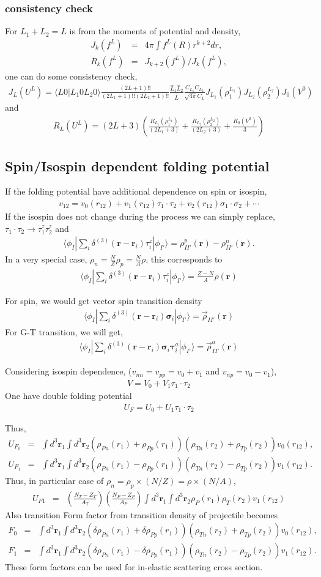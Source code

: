 \documentclass[11pt]{book}
\def\bm{\boldsymbol}
\def\vr{{\bm r}}
\def\la{\langle}
\def\ra{\rangle}
\newcommand{\bea}{\begin{eqnarray}}
\newcommand{\eea}{\end{eqnarray}}
\newcommand{\no}{\nonumber \\}
\begin{document}
\subsubsection{consistency check}
For $L_1+L_2=L$ is from the moments of potential and density,
\bea 
J_k(f^L)&=&4\pi\int f^L(R) r^{k+2} dr, \no 
R_k(f^L)&=& J_{k+2}(f^L)/J_k(f^L),
\eea 
one can do some consistency check,
\bea 
J_L(U^L)=\la L 0|L_1 0 L_2 0\ra \frac{(2L+1)!!}{(2L_1+1)!!(2L_2+1)!!}\frac{\hat{L}_1 \hat{L}_2}{\hat{L}}\frac{C_{L_1} C_{L_2}}{\sqrt{4\pi} C_L} 
 J_{L_1}(\rho^{L_1}_1)J_{L_2}(\rho^{L_2}_2)J_{0}(V^0)
\eea 
and 
\bea 
R_L(U^L)=(2L+3)\left(\frac{R_{L_1}(\rho_1^{L_1})}{(2L_1+3)}
      +\frac{R_{L_2}(\rho_2^{L_2})}{(2L_2+3)}
      +\frac{R_{0}(V^0)}{3} \right) 
\eea 

\subsection{Spin/Isospin dependent folding potential}
If the folding potential have additional dependence on spin or isospin,
\bea 
v_{12}=v_0(r_{12})+v_1(r_{12})\tau_1\cdot\tau_2+v_2(r_{12})\sigma_1\cdot\sigma_2+\cdots 
\eea  
If the isospin does not change during the process we can simply replace, 
$\tau_1\cdot\tau_2\to \tau_1^z \tau_2^z$ and 
\bea 
\la \phi_{I}|\sum_{i}  \delta^{(3)}(\vr-\vr_i)\tau_i^z |\phi_{I'}\ra
= \rho^p_{II'}(\vr)-\rho^n_{II'}(\vr).
\eea  
In a very special case, $\rho_n=\frac{N}{Z}\rho_p=\frac{N}{A}\rho$, this corresponds to 
\bea 
\la \phi_{I}|\sum_{i}  \delta^{(3)}(\vr-\vr_i)\tau_i^z |\phi_{I'}\ra =\frac{Z-N}{A}\rho(\vr)
\eea 


For spin, we would get vector spin transition density 
\bea 
\la \phi_{I}|\sum_{i}  \delta^{(3)}(\vr-\vr_i){\bm \sigma}_i|\phi_{I'}\ra
={\vec \rho}_{II'}(\vr)
\eea 
For G-T transition, we will get,
\bea 
\la \phi_{I}|\sum_{i}  \delta^{(3)}(\vr-\vr_i){\bm \sigma}_i{\bm \tau}^a_i|\phi_{I'}\ra
={\vec \rho}^a_{II'}(\vr)
\eea 

Considering isospin dependence, ($v_{nn}=v_{pp}=v_0+v_1$ and $v_{np}=v_0-v_1$),
\bea 
V= V_0 +V_1 \tau_1\cdot\tau_2 
\eea 
One have double folding potential
\bea 
U_F = U_0 + U_1 \tau_1\cdot\tau_2 
\eea 

Thus, 
\bea 
U_{F_0}&=&\int d^3\vr_1 \int d^3 \vr_2 (\rho_{P n}(r_1)+\rho_{P p}(r_1)  )
(\rho_{T n}(r_2)+\rho_{T p}(r_2)  ) v_0(r_{12}) ,\no 
U_{F_1}&=&\int d^3\vr_1 \int d^3 \vr_2 (\rho_{P n}(r_1)-\rho_{P p}(r_1)  ) 
(\rho_{T n}(r_2)-\rho_{T p}(r_2)  ) v_1(r_{12}). 
\eea 
Thus, in particular case of $\rho_n = \rho_p\times(N/Z) =\rho\times (N/A)$,
\bea 
U_{F1}&=& \left( \frac{N_T-Z_{T}}{A_T}\right) \left( \frac{N_P-Z_{P}}{A_P}\right)
\int d^3\vr_1 \int d^3 \vr_2 \rho_{P}(r_1)
\rho_{T}(r_2) v_1(r_{12})
\eea 
Also transition Form factor from transition density of projectile becomes
\bea 
F_{0} &=& \int d^3\vr_1 \int d^3 \vr_2 (\delta\rho_{P n}(r_1)+\delta \rho_{P p}(r_1)  )
(\rho_{T n}(r_2)+\rho_{T p}(r_2)  ) v_0(r_{12}) ,\no 
F_1&=&\int d^3\vr_1 \int d^3 \vr_2 (\delta \rho_{P n}(r_1)-\delta \rho_{P p}(r_1)  ) 
(\rho_{T n}(r_2)-\rho_{T p}(r_2)  ) v_1(r_{12}). 
\eea 
These form factors can be used for in-elastic scattering cross section. 
\end{document}
